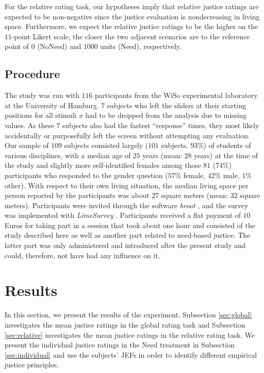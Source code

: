 \documentclass[12pt]{scrartcl}
\begin{document}
For the relative rating task, our hypotheses imply that relative justice ratings are expected to be non-negative since the justice evaluation is nondecreasing in living space.
Furthermore, we expect the relative justice ratings to be the higher on the $11$-point Likert scale, the closer the two adjacent scenarios are to the reference point of $0$ (NoNeed) and $1000$ units (Need), respectively.


\subsection{Procedure}\label{sec:procedure}
The study was run with $116$ participants from the WiSo experimental laboratory at the University of Hamburg.
$7$ subjects who left the sliders at their starting positions for all stimuli $x$ had to be dropped from the analysis due to missing values.
As these $7$ subjects also had the fastest ``response'' times, they most likely accidentally or purposefully left the screen without attempting any evaluation.
Our sample of $109$ subjects consisted largely ($101$ subjects, $93\%$) of students of various disciplines, with a median age of $25$ years (mean: $28$ years) at the time of the study and slightly more self-identified females among those $81$ ($74\%$) participants who responded to the gender question ($57\%$ female, $42\%$ male, $1\%$ other).
With respect to their own living situation, the median living space per person reported by the participants was about $27$ square meters (mean: $32$ square meters).
Participants were invited through the software \textit{hroot} \citep{bock_hroot_2014}, and the survey was implemented with \textit{LimeSurvey} \citep{limesurvey_project_team_limesurvey_2020}.
Participants received a flat payment of $10$ Euros for taking part in a session that took about one hour and consisted of the study described here as well as another part related to need-based justice.
The latter part was only administered and introduced after the present study and could, therefore, not have had any influence on it.


\section{Results}\label{sec:results}
In this section, we present the results of the experiment.
Subsection \ref{sec:global} investigates the mean justice ratings in the global rating task and Subsection \ref{sec:relative} investigates the mean justice ratings in the relative rating task.
We present the individual justice ratings in the Need treatment in Subsection \ref{sec:individual} and use the subjects' JEFs in order to identify different empirical justice principles.
\end{document}
